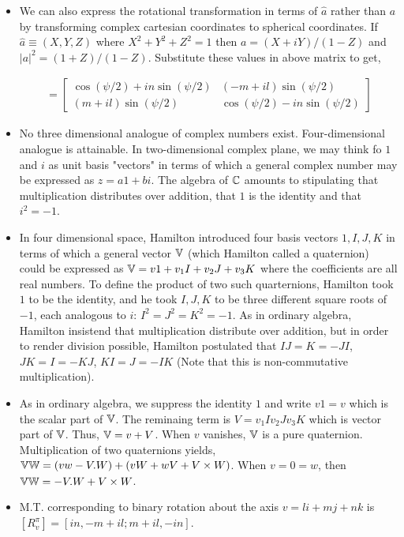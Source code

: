 \documentclass[12pt]{article}
\def\mb{\ensuremath\mathbb}
\def\C{\ensuremath\mb{C}}
\def\V{\ensuremath\mb{V}}
\def\W{\ensuremath\mb{W}}
\begin{document}
\begin{itemize}
    \item We can also express the rotational transformation in terms of $\hat{a}$ rather than $a$ by transforming complex cartesian coordinates to spherical coordinates. If $\hat{a} \equiv (X,Y,Z)$ where $X^2+Y^2+Z^2=1$ then $a=(X+iY)/(1-Z)$ and $|a|^2 = (1+Z)/(1-Z)$. Substitute these values in above matrix to get,

    \begin{align*}
    [R^{\psi}_{V}] = \begin{bmatrix}\cos(\psi/2)+in\sin(\psi/2)&(-m+il)\sin(\psi/2)\\(m+il)\sin(\psi/2)&\cos(\psi/2)-in\sin(\psi/2)\end{bmatrix}
    \end{align*}

    \item No three dimensional analogue of complex numbers exist. Four-dimensional analogue is attainable. In two-dimensional complex plane, we may think fo $1$ and $i$ as unit basis "vectors" in terms of which a general complex number may be expressed as $z=a1+bi$. The algebra of $\C$ amounts to stipulating that multiplication distributes over addition, that $1$ is the identity and that $i^2=-1$.
    
    \item In four dimensional space, Hamilton introduced four basis vectors $1,I,J,K$ in terms of which a general vector $\V$ (which Hamilton called a quaternion) could be expressed as $\V = v1 + v_1I+v_2J+v_3K$ where the coefficients are all real numbers. To define the product of two such quarternions, Hamilton took $1$ to be the identity, and he took $I,J,K$ to be three different square roots of $-1$, each analogous to $i$: $I^2=J^2=K^2=-1$. As in ordinary algebra, Hamilton insistend that multiplication distribute over addition, but in order to render division possible, Hamilton postulated that $IJ=K=-JI$, $JK=I=-KJ$, $KI=J=-IK$ (Note that this is non-commutative multiplication).

    \item As in ordinary algebra, we suppress the identity $1$ and write $v1 = v$ which is the scalar part of $\V$. The reminaing term is $V = v_1Iv_2Jv_3K$ which is vector part of $\V$. Thus, $\V=v+V$. When $v$ vanishes, $\V$ is a pure quaternion. Multiplication of two quaternions yields, $\V\W = (vw-V.W) + (vW+wV+V\times W)$. When $v=0=w$, then $\V\W = -V.W + V\times W$.

    \item M.T. corresponding to binary rotation about the axis $v=li+mj+nk$ is $[R^{\pi}_{v}] = [in,-m+il;m+il,-in]$.


\end{itemize}
\end{document}
